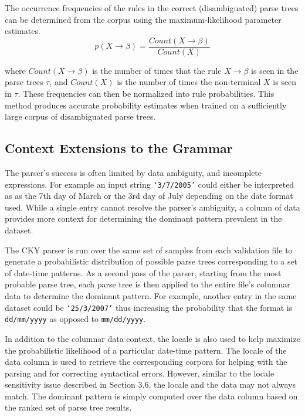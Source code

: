 The occurrence frequencies of the rules in the correct
(disambiguated) parse trees can be determined from the corpus using the maximum-likelihood parameter estimates.
\begin{equation}
p(X \rightarrow \beta) = \frac{Count(X \rightarrow \beta)}{Count(X)}
\end{equation}

where $Count(X \rightarrow \beta)$ is the number of times that the rule $X \rightarrow \beta$ is seen in
the parse trees $\tau$, and $Count(X)$ is the number of times the non-terminal $X$ is seen in $\tau$. These frequencies can then be normalized into rule probabilities. This method produces accurate probability estimates when trained on a sufficiently large corpus of disambiguated parse trees. 

\subsection{Context Extensions to the Grammar}

The parser's success is often limited by data ambiguity, and incomplete expressions. For example an input string \texttt{`3/7/2005'} could either be interpreted as as the 7th day of March or the 3rd day of July depending on the date format used. While a single entry cannot resolve the parser's ambiguity, a column of data provides more context for determining the dominant pattern prevalent in the dataset. 

The CKY parser is run over the same set of samples from each validation file to generate a probabilistic distribution of possible parse trees corresponding to a set of date-time patterns. As a second pass of the parser, starting from the most probable parse tree, each parse tree is then applied to the entire file's columnar data to determine the dominant pattern. For example, another entry in the same dataset could be \texttt{`25/3/2007'} thus increasing the probability that the format is \texttt{dd/mm/yyyy} as opposed to \texttt{mm/dd/yyyy}.

In addition to the columnar data context, the locale is also used to help maximize the probabilistic likelihood of a particular date-time pattern. The locale of the data column is used to retrieve the corresponding corpora for helping with the parsing and for correcting syntactical errors. However, similar to the locale sensitivity issue described in Section 3.6, the locale and the data may not always match. The dominant pattern is simply computed over the data column based on the ranked set of parse tree results.
